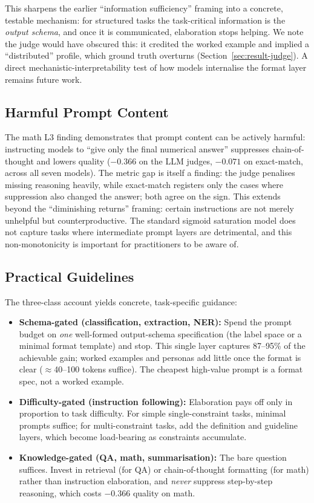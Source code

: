 This sharpens the earlier ``information sufficiency'' framing into a concrete,
testable mechanism: for structured tasks the task-critical information is the
\emph{output schema}, and once it is communicated, elaboration stops helping.
We note the judge would have obscured this: it credited the worked example and
implied a ``distributed'' profile, which ground truth overturns
(Section~\ref{sec:result-judge}).
A direct mechanistic-interpretability test of how models internalise the format
layer remains future work.

\subsection{Harmful Prompt Content}

The math L3 finding demonstrates that prompt content can be actively harmful:
instructing models to ``give only the final numerical answer'' suppresses
chain-of-thought and lowers quality ($-0.366$ on the LLM judges, $-0.071$ on
exact-match, across all seven models).
The metric gap is itself a finding: the judge penalises missing reasoning
heavily, while exact-match registers only the cases where suppression also
changed the answer; both agree on the sign.
This extends beyond the ``diminishing returns'' framing: certain instructions
are not merely unhelpful but counterproductive.
The standard sigmoid saturation model does not capture tasks where
intermediate prompt layers are detrimental, and this non-monotonicity is
important for practitioners to be aware of.

\subsection{Practical Guidelines}

The three-class account yields concrete, task-specific guidance:

\begin{itemize}
  \item \textbf{Schema-gated (classification, extraction, NER):} Spend the
    prompt budget on \emph{one} well-formed output-schema specification (the
    label space or a minimal format template) and stop. This single layer
    captures 87--95\% of the achievable gain; worked examples and personas add
    little once the format is clear ($\approx$40--100 tokens suffice). The
    cheapest high-value prompt is a format spec, not a worked example.
  \item \textbf{Difficulty-gated (instruction following):} Elaboration pays off
    only in proportion to task difficulty. For simple single-constraint tasks,
    minimal prompts suffice; for multi-constraint tasks, add the definition and
    guideline layers, which become load-bearing as constraints accumulate.
  \item \textbf{Knowledge-gated (QA, math, summarisation):} The bare question
    suffices. Invest in retrieval (for QA) or chain-of-thought formatting (for
    math) rather than instruction elaboration, and \emph{never} suppress
    step-by-step reasoning, which costs $-0.366$ quality on math.
\end{itemize}

